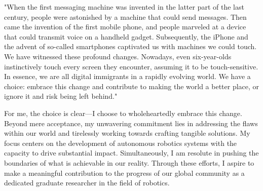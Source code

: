 \documentclass{article}
\begin{document}
"When the first messaging machine was invented in the latter part of the last century, people were astonished 
by a machine that could send messages. Then came the invention of the first mobile phone, 
and people marveled at a device that could transmit voice on a handheld gadget. Subsequently, 
the iPhone and the advent of so-called smartphones captivated us with machines we could touch. 
We have witnessed these profound changes. Nowadays, even six-year-olds instinctively touch every screen they encounter, 
assuming it to be touch-sensitive. In essence, we are all digital immigrants in a rapidly evolving world. We have a choice: 
embrace this change and contribute to making the world a better place, or ignore it and risk being left behind."

For me, the choice is clear—I choose to wholeheartedly embrace this change.
Beyond mere acceptance, my unwavering commitment lies in addressing the flaws within our world 
and tirelessly working towards crafting tangible solutions.
My focus centers on the development of autonomous robotics systems with the capacity to 
drive substantial impact. Simultaneously, I am resolute in pushing the boundaries of what is 
achievable in our reality. Through these efforts, I aspire to make a meaningful contribution 
to the progress of our global community as a dedicated graduate researcher in the field of robotics.

\printbibliography
\end{document}
